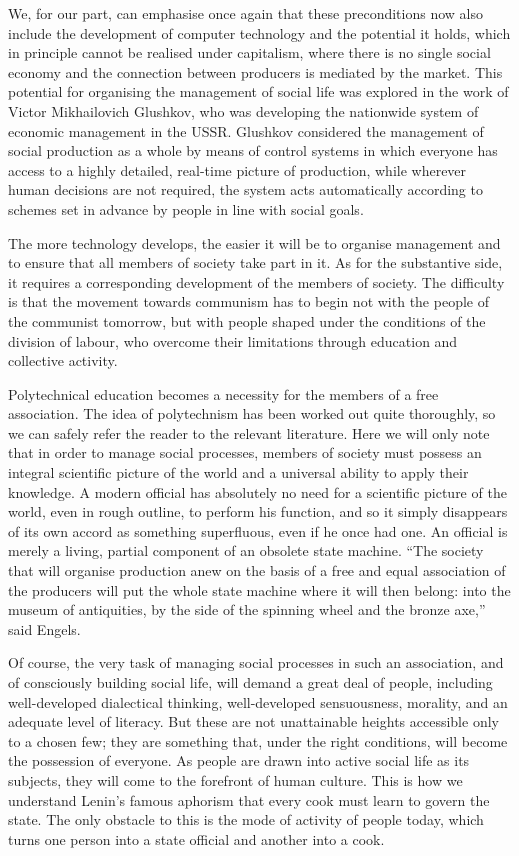 \documentclass[12pt,a4paper,openany]{book}
\begin{document}
We, for our part, can emphasise once again that these preconditions now also include the development of computer technology and the potential it holds, which in principle cannot be realised under capitalism, where there is no single social economy and the connection between producers is mediated by the market. This potential for organising the management of social life was explored in the work of Victor Mikhailovich Glushkov, who was developing the nationwide system of economic management in the USSR. Glushkov considered the management of social production as a whole by means of control systems in which everyone has access to a highly detailed, real-time picture of production, while wherever human decisions are not required, the system acts automatically according to schemes set in advance by people in line with social goals.

The more technology develops, the easier it will be to organise management and to ensure that all members of society take part in it. As for the substantive side, it requires a corresponding development of the members of society. The difficulty is that the movement towards communism has to begin not with the people of the communist tomorrow, but with people shaped under the conditions of the division of labour, who overcome their limitations through education and collective activity.

Polytechnical education becomes a necessity for the members of a free association. The idea of polytechnism has been worked out quite thoroughly, so we can safely refer the reader to the relevant literature. Here we will only note that in order to manage social processes, members of society must possess an integral scientific picture of the world and a universal ability to apply their knowledge. A modern official has absolutely no need for a scientific picture of the world, even in rough outline, to perform his function, and so it simply disappears of its own accord as something superfluous, even if he once had one. An official is merely a living, partial component of an obsolete state machine. “The society that will organise production anew on the basis of a free and equal association of the producers will put the whole state machine where it will then belong: into the museum of antiquities, by the side of the spinning wheel and the bronze axe,” said Engels.

Of course, the very task of managing social processes in such an association, and of consciously building social life, will demand a great deal of people, including well-developed dialectical thinking, well-developed sensuousness, morality, and an adequate level of literacy. But these are not unattainable heights accessible only to a chosen few; they are something that, under the right conditions, will become the possession of everyone. As people are drawn into active social life as its subjects, they will come to the forefront of human culture. This is how we understand Lenin’s famous aphorism that every cook must learn to govern the state. The only obstacle to this is the mode of activity of people today, which turns one person into a state official and another into a cook.
\end{document}
